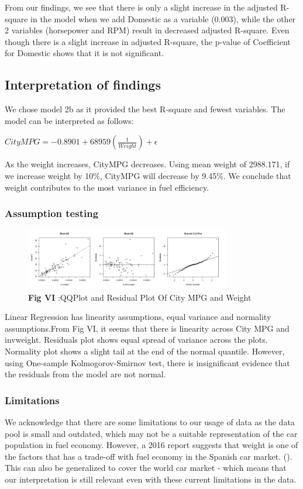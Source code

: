 \documentclass[12pt]{article}
\begin{document}
From our findings, we see that there is only a slight increase in the adjusted R-square in the model when we add Domestic as a variable (0.003), while the other 2 variables (horsepower and RPM) result in decreased adjusted R-square. Even though there is a slight increase in adjusted R-square, the p-value of Coefficient for Domestic shows that it is not significant. 

\subsection{Interpretation of findings}
We chose model 2b as it provided the best R-square and fewest variables. The model can be interpreted as follows: 
\begin{center}
$CityMPG = -0.8901+ 68959(\frac{1}{Weight}) + \epsilon$
\end{center}
As the weight increases, CityMPG decreases. Using mean weight of 2988.171, if we increase weight by 10\%, CityMPG will decrease by 9.45\%. 
We conclude that weight contributes to the most variance in fuel efficiency. 
\subsubsection{Assumption testing}

\begin{figure}[!htb]
	\caption*{\textbf{Fig VI }:{QQPlot and Residual Plot Of City MPG and Weight}}
	\begin{center}
	\includegraphics[width=0.8\textwidth]{Assumption.png}
	\end{center}
\end{figure}

Linear Regression has linearity assumptions, equal variance and normality assumptions.From Fig VI, it seems that there is linearity across City MPG and invweight. Residuals plot shows equal spread of variance across the plots. Normality plot shows a slight tail at the end of the normal quantile. However, using One-sample Kolmogorov-Smirnov test, there is insignificant evidence that the residuals from the model are not normal. 
\subsubsection{Limitations}
We acknowledge that there are some limitations to our usage of data as the data pool is small and outdated, which may not be a suitable representation of the car population in fuel economy. However, a 2016 report suggests that weight is one of the factors that has a trade-off with fuel economy in the Spanish car market. (\cite{IEB}). This can also be generalized to cover the world car market - which means that our interpretation is still relevant even with these current limitations in the data. 
\end{document}
